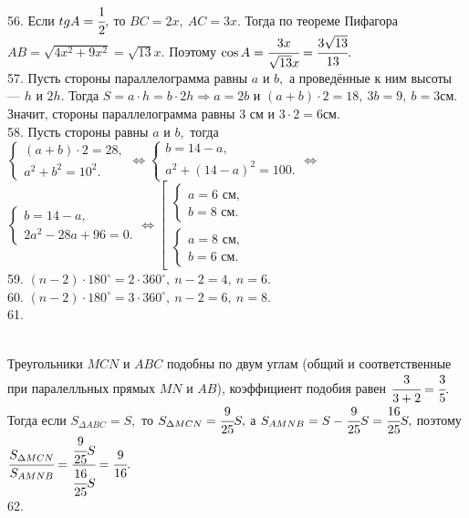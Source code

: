 56. Если $tg A=\cfrac{1}{2},$ то $BC=2x,\ AC=3x.$ Тогда по теореме Пифагора $AB=\sqrt{4x^2+9x^2}=\sqrt{13}x.$ Поэтому $\cos A=\cfrac{3x}{\sqrt{13}x}=\cfrac{3\sqrt{13}}{13}.$\\
57. Пусть стороны параллелограмма равны $a$ и $b,$ а проведённые к ним высоты --- $h$ и $2h.$ Тогда $S=a\cdot h=b\cdot 2h\Rightarrow a=2b$ и $(a+b)\cdot2=18,\ 3b=9,\ b=3$см. Значит, стороны параллелограмма равны 3 см и $3\cdot2=6$см.\\
58. Пусть стороны равны $a$ и $b,$ тогда $\begin{cases}(a+b)\cdot2=28,\\ a^2+b^2=10^2.\end{cases}\Leftrightarrow
\begin{cases}b=14-a,\\ a^2+(14-a)^2=100.\end{cases}\Leftrightarrow$\\$
\begin{cases}b=14-a,\\ 2a^2-28a+96=0.\end{cases}\Leftrightarrow
\left[\begin{array}{l}\begin{cases}a=6\text{ см},\\ b=8\text{ см}.\end{cases}\\ \begin{cases}a=8\text{ см},\\ b=6\text{ см}.\end{cases}\end{array}\right.$\\
59. $(n-2)\cdot180^\circ=2\cdot360^\circ,\ n-2=4,\ n=6.$\\
60. $(n-2)\cdot180^\circ=3\cdot360^\circ,\ n-2=6,\ n=8.$\\
61. \begin{figure}[ht!]
\end{figure}\\
Треугольники $MCN$ и $ABC$ подобны по двум углам (общий и соответственные при паралелльных прямых $MN$ и $AB$), коэффициент подобия равен $\cfrac{3}{3+2}=\cfrac{3}{5}.$ Тогда если $S_{\Delta ABC}=S,$ то $S_{\Delta MCN}=\cfrac{9}{25}S,$ а $S_{AMNB}=S-\cfrac{9}{25}S=\cfrac{16}{25}S,$ поэтому $\cfrac{S_{\Delta MCN}}{S_{AMNB}}=\cfrac{\cfrac{9}{25}S}{\cfrac{16}{25}S}=\cfrac{9}{16}.$\\
62. \begin{figure}[ht!]
\end{figure}\\

